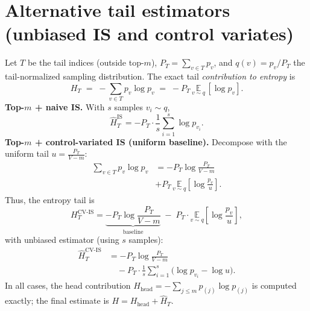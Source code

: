 \documentclass[11pt]{article}
\begin{document}
\section{Alternative tail estimators (unbiased IS and control variates)}
\label{app:tail-IS}
Let $T$ be the tail indices (outside top-$m$), $P_T=\sum_{v\in T}p_v$, and $q(v)=p_v/P_T$ the tail-normalized sampling distribution. The exact tail \emph{contribution to entropy} is
\[
	H_T \;=\; -\sum_{v\in T} p_v \log p_v \;=\; -P_T\,\underset{v\sim q}{\mathbb{E}}\,[\log p_v].
\]
\textbf{Top-$m$ + naive IS.} With $s$ samples $v_i\!\sim q$,
\[
	\widehat{H}_T^{\text{IS}}
	= -P_T \cdot \frac{1}{s}\sum_{i=1}^s \log p_{v_i}.
\]
\textbf{Top-$m$ + control-variated IS (uniform baseline).}
Decompose with the uniform tail $u=\tfrac{P_T}{V-m}$:
\begin{align*}
	\sum_{v\in T} p_v \log p_v
	 & = -P_T\log\!\frac{P_T}{V-m}                                              \\
	 & + P_T\,\underset{v\sim q}{\mathbb{E}}\!\left[\log\!\frac{p_v}{u}\right].
\end{align*}
Thus, the entropy tail is
\[
	H_T^{\text{CV-IS}}
	= \underbrace{-P_T\log\!\frac{P_T}{V-m}}_{\text{baseline}}
	\;-\; P_T \cdot \underset{v\sim q}{\mathbb{E}}\!\left[\log\!\frac{p_v}{u}\right],
\]
with unbiased estimator (using $s$ samples):
\begin{align*}
	\widehat{H}_T^{\text{CV-IS}}
	 & = -P_T\log\!\frac{P_T}{V-m}                                                \\
	 & \quad - P_T \cdot \frac{1}{s}\sum_{i=1}^s \Big(\log p_{v_i} - \log u\Big).
\end{align*}
In all cases, the head contribution $H_{\text{head}}=-\sum_{j\le m}p_{(j)}\log p_{(j)}$ is computed exactly; the final estimate is $H=H_{\text{head}}+\widehat{H}_T$.
\end{document}
